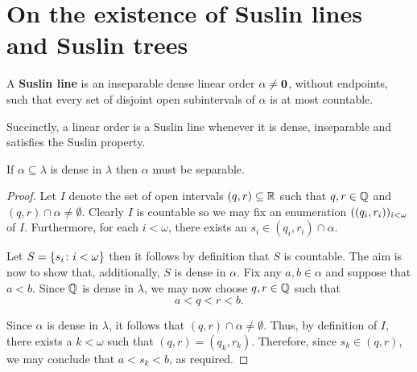 \section{On the existence of Suslin lines and Suslin trees}

\begin{dfn}
	A \textbf{Suslin line} is an inseparable dense linear order
	$\alpha\neq\mathbf{0}$, without endpoints, such that every set of disjoint open
	subintervals of $\alpha$ is at most countable.
\end{dfn}

Succinctly, a linear order is a Suslin line whenever it is dense, inseparable
and satisfies the Suslin property.

\begin{prp}\label{prp:densesublambda}
	If $\alpha\subseteq\lambda$ is dense in $\lambda$ then $\alpha$ must be
	separable.
\end{prp}
\begin{proof}
	Let $I$ denote the set of open intervals $(q,r)\subseteq\mathbb{R}$ such that
	$q,r\in\mathbb{Q}$ and $(q,r)\cap\alpha\neq\emptyset$.  Clearly $I$ is countable
	so we may fix an enumeration $((q_{i},r_{i}))_{i<\omega}$ of $I$.
	Furthermore, for each $i<\omega$, there exists an
	$s_{i}\in(q_{i},r_{i})\cap\alpha$.

	Let $S=\left\lbrace s_{i}\colon i<\omega \right\rbrace$ then it follows by definition that $S$ is
	countable.  The aim is now to show that, additionally, $S$ is dense in
	$\alpha$.  Fix any $a,b\in\alpha$ and suppose that $a<b$.  Since $\mathbb{Q}$ is
	dense in $\lambda$, we may now choose $q,r\in\mathbb{Q}$ such that
	\begin{equation}
		a<q<r<b.
	\end{equation}

	Since $\alpha$ is dense in $\lambda$, it follows that
	$(q,r)\cap\alpha\neq\emptyset$. Thus, by definition of $I$, there exists a
	$k<\omega$ such that $(q,r)=(q_{k},r_{k})$.  Therefore, since $s_{k}\in(q,r)$,
	we may conclude that $a<s_{k}<b$, as required.
\end{proof}

